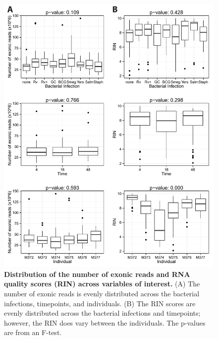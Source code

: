 \begin{figure}[!htb]
\centering
\includegraphics[width=5in]{img/ch02/fig-S09-rin-and-reads.pdf}
\caption[Distribution of the number of exonic reads and RNA quality
  scores (RIN) across variables of interest.]{\textbf{Distribution of
    the number of exonic reads and RNA quality scores (RIN) across
    variables of interest.} (A) The number of exonic reads is evenly
  distributed across the bacterial infections, timepoints, and
  individuals. (B) The RIN scores are evenly distributed across the
  bacterial infections and timepoints; however, the RIN does vary
  between the individuals.  The p-values are from an F-test.}
\label{fig:rin-and-reads}
\end{figure}

